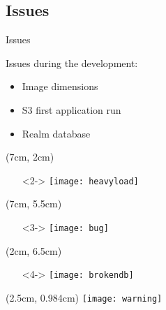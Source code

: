 \subsection{Issues}
\begin{frame}{Issues}
  
  Issues during the development:
  \begin{itemize}
   \item<2-> Image dimensions
   \item<3-> S3 first application run
   \item<4-> Realm database
  \end{itemize}
  
  \begin{textblock*}{5cm}(7cm, 2cm)
  \begin{itemize}
   \item[]<2-> \texttt{[image: heavyload]}
  \end{itemize}

  \end{textblock*}
  
  \begin{textblock*}{5cm}(7cm, 5.5cm)
  \begin{itemize}
   \item[]<3-> \texttt{[image: bug]}
  \end{itemize}
  \end{textblock*}

  \begin{textblock*}{5cm}(2cm, 6.5cm)
  \begin{itemize}
   \item[]<4-> \texttt{[image: brokendb]}
  \end{itemize}
  \end{textblock*}


  \begin{textblock*}{5cm}(2.5cm, 0.984cm)
   \texttt{[image: warning]}
  \end{textblock*}
\end{frame}
